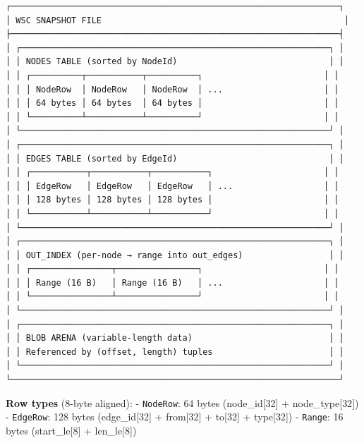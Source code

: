 \documentclass[
  11pt,
]{book}
\begin{document}
\begin{verbatim}
┌─────────────────────────────────────────────────────────────────┐
│ WSC SNAPSHOT FILE                                                │
├─────────────────────────────────────────────────────────────────┤
│ ┌─────────────────────────────────────────────────────────────┐ │
│ │ NODES TABLE (sorted by NodeId)                              │ │
│ │ ┌──────────┬───────────┬──────────┐                        │ │
│ │ │ NodeRow  │ NodeRow   │ NodeRow  │ ...                    │ │
│ │ │ 64 bytes │ 64 bytes  │ 64 bytes │                        │ │
│ │ └──────────┴───────────┴──────────┘                        │ │
│ └─────────────────────────────────────────────────────────────┘ │
│ ┌─────────────────────────────────────────────────────────────┐ │
│ │ EDGES TABLE (sorted by EdgeId)                              │ │
│ │ ┌───────────┬───────────┬───────────┐                      │ │
│ │ │ EdgeRow   │ EdgeRow   │ EdgeRow   │ ...                  │ │
│ │ │ 128 bytes │ 128 bytes │ 128 bytes │                      │ │
│ │ └───────────┴───────────┴───────────┘                      │ │
│ └─────────────────────────────────────────────────────────────┘ │
│ ┌─────────────────────────────────────────────────────────────┐ │
│ │ OUT_INDEX (per-node → range into out_edges)                 │ │
│ │ ┌────────────────┬────────────────┐                        │ │
│ │ │ Range (16 B)   │ Range (16 B)   │ ...                    │ │
│ │ └────────────────┴────────────────┘                        │ │
│ └─────────────────────────────────────────────────────────────┘ │
│ ┌─────────────────────────────────────────────────────────────┐ │
│ │ BLOB ARENA (variable-length data)                           │ │
│ │ Referenced by (offset, length) tuples                       │ │
│ └─────────────────────────────────────────────────────────────┘ │
└─────────────────────────────────────────────────────────────────┘
\end{verbatim}

\textbf{Row types} (8-byte aligned): - \texttt{NodeRow}: 64 bytes
(node\_id{[}32{]} + node\_type{[}32{]}) - \texttt{EdgeRow}: 128 bytes
(edge\_id{[}32{]} + from{[}32{]} + to{[}32{]} + type{[}32{]}) -
\texttt{Range}: 16 bytes (start\_le{[}8{]} + len\_le{[}8{]})

\end{document}
